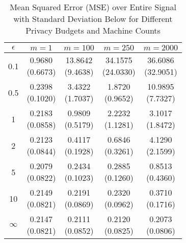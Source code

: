 \begin{table}[ht]
\centering
\begin{tabular}{ccccc}
  \toprule
$\epsilon$ & $m=1$ & $m=100$ & $m=250$ & $m=2000$ \\ 
  \midrule
0.1 & \makecell{0.9680 \\ (0.6673)} & \makecell{13.8642 \\ (9.4638)} & \makecell{34.1575 \\ (24.0330)} & \makecell{36.6086 \\ (32.9051)} \\ 
  0.5 & \makecell{0.2398 \\ (0.1020)} & \makecell{3.4322 \\ (1.7037)} & \makecell{1.8720 \\ (0.9652)} & \makecell{10.9895 \\ (7.7327)} \\ 
  1 & \makecell{0.2183 \\ (0.0858)} & \makecell{0.9809 \\ (0.5179)} & \makecell{2.2232 \\ (1.1281)} & \makecell{3.1017 \\ (1.8472)} \\ 
  2 & \makecell{0.2123 \\ (0.0844)} & \makecell{0.4117 \\ (0.1928)} & \makecell{0.6846 \\ (0.3261)} & \makecell{4.1290 \\ (2.1599)} \\ 
  5 & \makecell{0.2079 \\ (0.0822)} & \makecell{0.2434 \\ (0.1023)} & \makecell{0.2885 \\ (0.1260)} & \makecell{0.8513 \\ (0.4360)} \\ 
  10 & \makecell{0.2149 \\ (0.0821)} & \makecell{0.2191 \\ (0.0869)} & \makecell{0.2320 \\ (0.0962)} & \makecell{0.3710 \\ (0.1716)} \\ 
  $\infty$ & \makecell{0.2147 \\ (0.0821)} & \makecell{0.2111 \\ (0.0852)} & \makecell{0.2120 \\ (0.0825)} & \makecell{0.2073 \\ (0.0806)} \\ 
   \bottomrule
\end{tabular}
\caption{Mean Squared Error (MSE) over Entire Signal with Standard Deviation Below for Different Privacy Budgets and Machine Counts} 
\label{tab:mse_total}
\end{table}
